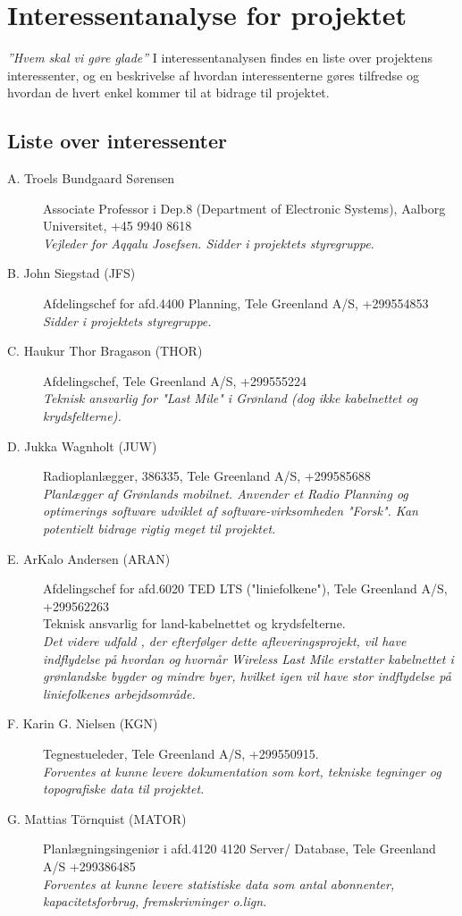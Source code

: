 \section{Interessentanalyse for projektet}
\emph{''Hvem skal vi gøre glade''}
I interessentanalysen findes en liste over projektens interessenter, og en beskrivelse af hvordan interessenterne gøres tilfredse og hvordan de hvert enkel kommer til at bidrage til projektet.

\subsection{Liste over interessenter}

\begin{description}
 \item [A. Troels Bundgaard Sørensen] Associate Professor i Dep.8 (Department of Electronic Systems), Aalborg Universitet, +45 9940 8618\\
  \emph{Vejleder for Aqqalu Josefsen. Sidder i projektets styregruppe}.
 \item [B. John Siegstad (JFS)] Afdelingschef for afd.4400 Planning, Tele Greenland A/S, +299554853\\
 \emph{Sidder i projektets styregruppe.}
 \item [C. Haukur Thor Bragason (THOR)] Afdelingschef, Tele Greenland A/S, +299555224\\
  \emph{Teknisk ansvarlig for "Last Mile" i Grønland (dog ikke kabelnettet og krydsfelterne).}
 \item [D. Jukka Wagnholt (JUW)] Radioplanlægger, 386335, Tele Greenland A/S, +299585688\\
 \emph{Planlægger af Grønlands mobilnet. Anvender et Radio Planning og optimerings software udviklet af software-virksomheden "Forsk". Kan potentielt bidrage rigtig meget til projektet.}
 \item [E. ArKalo Andersen (ARAN)] Afdelingschef for afd.6020 TED LTS ("liniefolkene"), Tele Greenland A/S, +299562263\\
  Teknisk ansvarlig for land-kabelnettet og krydsfelterne.\\
  \emph{Det videre udfald , der efterfølger dette afleveringsprojekt, vil have indflydelse på hvordan og hvornår Wireless Last Mile erstatter kabelnettet i grønlandske bygder og mindre byer, hvilket igen vil have stor indflydelse på liniefolkenes arbejdsområde.}
  \item [F. Karin G. Nielsen (KGN)] Tegnestueleder, Tele Greenland A/S, +299550915.\\
   \emph{Forventes at kunne levere dokumentation som kort, tekniske tegninger og topografiske data til projektet.}
  \item[G. Mattias Törnquist (MATOR)] Planlægningsingeniør i afd.4120 4120 Server/ Database, Tele Greenland A/S +299386485\\
   \emph{Forventes at kunne levere statistiske data som antal abonnenter, kapacitetsforbrug, fremskrivninger o.lign.} 
\end{description}

